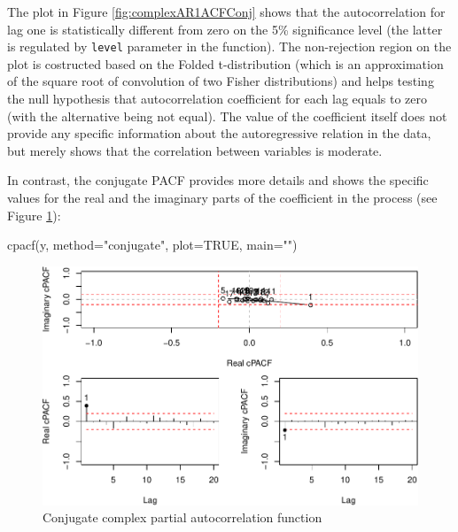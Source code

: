 \documentclass[
]{book}
\newenvironment{Shaded}{\begin{snugshade}}{\end{snugshade}}
\newcommand{\AttributeTok}[1]{\textcolor[rgb]{0.77,0.63,0.00}{#1}}
\newcommand{\ConstantTok}[1]{\textcolor[rgb]{0.00,0.00,0.00}{#1}}
\newcommand{\FunctionTok}[1]{\textcolor[rgb]{0.00,0.00,0.00}{#1}}
\newcommand{\NormalTok}[1]{#1}
\newcommand{\StringTok}[1]{\textcolor[rgb]{0.31,0.60,0.02}{#1}}
\begin{document}
The plot in Figure \ref{fig:complexAR1ACFConj} shows that the autocorrelation for lag one is statistically different from zero on the 5\% significance level (the latter is regulated by \texttt{level} parameter in the function). The non-rejection region on the plot is costructed based on the Folded t-distribution (which is an approximation of the square root of convolution of two Fisher distributions) and helps testing the null hypothesis that autocorrelation coefficient for each lag equals to zero (with the alternative being not equal). The value of the coefficient itself does not provide any specific information about the autoregressive relation in the data, but merely shows that the correlation between variables is moderate.

In contrast, the conjugate PACF provides more details and shows the specific values for the real and the imaginary parts of the coefficient in the process (see Figure \ref{fig:complexAR1PACFConj}):

\begin{Shaded}
\begin{Highlighting}[]
\FunctionTok{cpacf}\NormalTok{(y, }\AttributeTok{method=}\StringTok{"conjugate"}\NormalTok{, }\AttributeTok{plot=}\ConstantTok{TRUE}\NormalTok{, }\AttributeTok{main=}\StringTok{""}\NormalTok{)}
\end{Highlighting}
\end{Shaded}

\begin{figure}
\centering
\includegraphics{Svetunkov---Svetunkov---Complex-Valued-Econometrics_files/figure-latex/complexAR1PACFConj-1.pdf}
\caption{\label{fig:complexAR1PACFConj}Conjugate complex partial autocorrelation function}
\end{figure}
\end{document}

